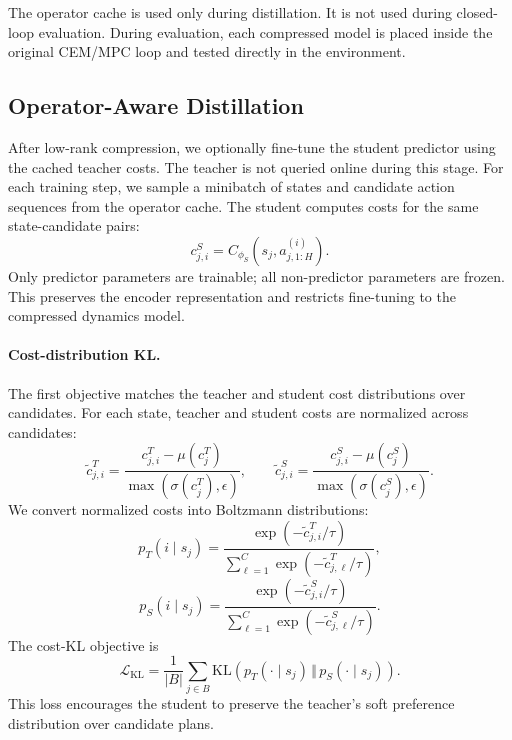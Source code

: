 \documentclass[11pt]{article}
\begin{document}
The operator cache is used only during distillation. It is not used during closed-loop evaluation. During evaluation, each compressed model is placed inside the original CEM/MPC loop and tested directly in the environment.

\subsection{Operator-Aware Distillation}
\label{sec:operator_distillation}

After low-rank compression, we optionally fine-tune the student predictor using the cached teacher costs. The teacher is not queried online during this stage. For each training step, we sample a minibatch of states and candidate action sequences from the operator cache. The student computes costs for the same state-candidate pairs:
\[
    c_{j,i}^{S}
    =
    C_{\phi_S}(s_j, a_{j,1:H}^{(i)}).
\]
Only predictor parameters are trainable; all non-predictor parameters are frozen. This preserves the encoder representation and restricts fine-tuning to the compressed dynamics model.

\paragraph{Cost-distribution KL.}
The first objective matches the teacher and student cost distributions over candidates. For each state, teacher and student costs are normalized across candidates:
\[
    \tilde c_{j,i}^{T}
    =
    \frac{c_{j,i}^{T} - \mu(c_j^T)}
    {\max(\sigma(c_j^T), \epsilon)},
    \qquad
    \tilde c_{j,i}^{S}
    =
    \frac{c_{j,i}^{S} - \mu(c_j^S)}
    {\max(\sigma(c_j^S), \epsilon)}.
\]
We convert normalized costs into Boltzmann distributions:
\[
    p_T(i \mid s_j)
    =
    \frac{\exp(-\tilde c_{j,i}^{T}/\tau)}
    {\sum_{\ell=1}^{C}\exp(-\tilde c_{j,\ell}^{T}/\tau)},
\]
\[
    p_S(i \mid s_j)
    =
    \frac{\exp(-\tilde c_{j,i}^{S}/\tau)}
    {\sum_{\ell=1}^{C}\exp(-\tilde c_{j,\ell}^{S}/\tau)}.
\]
The cost-KL objective is
\[
    \mathcal{L}_{\mathrm{KL}}
    =
    \frac{1}{|B|}
    \sum_{j \in B}
    \mathrm{KL}
    \left(
        p_T(\cdot \mid s_j)
        \,\Vert\,
        p_S(\cdot \mid s_j)
    \right).
\]
This loss encourages the student to preserve the teacher's soft preference distribution over candidate plans.
\end{document}
